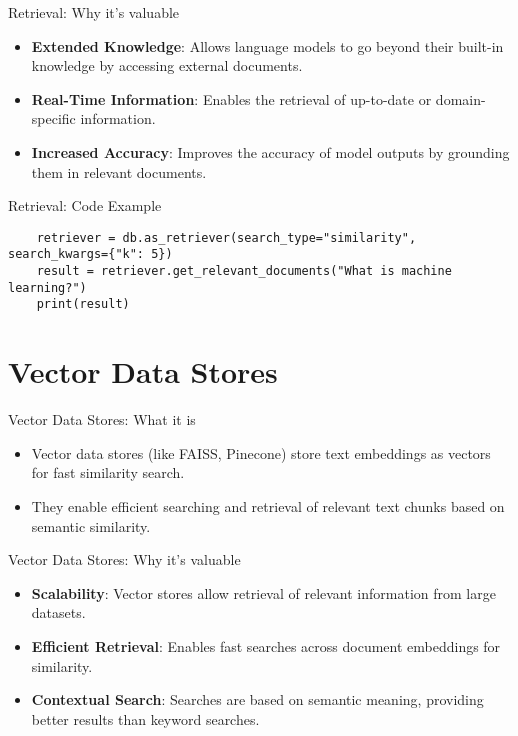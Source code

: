 \documentclass{beamer}
\begin{document}
\begin{frame}{Retrieval: Why it's valuable}
    \begin{itemize}
        \item \textbf{Extended Knowledge}: Allows language models to go beyond their built-in knowledge by accessing external documents.
        \item \textbf{Real-Time Information}: Enables the retrieval of up-to-date or domain-specific information.
        \item \textbf{Increased Accuracy}: Improves the accuracy of model outputs by grounding them in relevant documents.
    \end{itemize}
\end{frame}

\begin{frame}[fragile]{Retrieval: Code Example}
    \begin{verbatim}
    retriever = db.as_retriever(search_type="similarity", search_kwargs={"k": 5})
    result = retriever.get_relevant_documents("What is machine learning?")
    print(result)
    \end{verbatim}
\end{frame}

\section{Vector Data Stores}

\begin{frame}{Vector Data Stores: What it is}
    \begin{itemize}
        \item Vector data stores (like FAISS, Pinecone) store text embeddings as vectors for fast similarity search.
        \item They enable efficient searching and retrieval of relevant text chunks based on semantic similarity.
    \end{itemize}
\end{frame}

\begin{frame}{Vector Data Stores: Why it's valuable}
    \begin{itemize}
        \item \textbf{Scalability}: Vector stores allow retrieval of relevant information from large datasets.
        \item \textbf{Efficient Retrieval}: Enables fast searches across document embeddings for similarity.
        \item \textbf{Contextual Search}: Searches are based on semantic meaning, providing better results than keyword searches.
    \end{itemize}
\end{frame}
\end{document}
